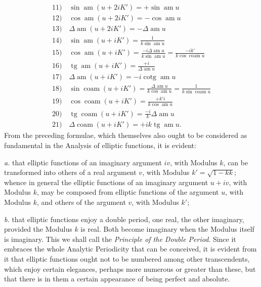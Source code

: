 \documentclass{article}
\begin{document}
\[
\begin{gathered}
\text{11)}\quad\sin\operatorname{am}(u+2iK')=+\sin\operatorname{am}u\\[1ex]
\text{12)}\quad\cos\operatorname{am}(u+2iK')=-\cos\operatorname{am}u\\[1ex]
\text{13)}\quad\Delta\operatorname{am}(u+2iK')=-\Delta\operatorname{am}u\\[1ex]
\text{14)}\quad\sin\operatorname{am}(u+iK')=\frac{1}{k\sin\operatorname{am}u}\\[1ex]
\text{15)}\quad\cos\operatorname{am}(u+iK')=\frac{-i\Delta\operatorname{am}u}{k\sin\operatorname{am}u}=\frac{-ik'}{k\cos\operatorname{coam}u}\\[1ex]
\text{16)}\quad\operatorname{tg}\operatorname{am}(u+iK')=\frac{+i}{\Delta\operatorname{am}u}\\[1ex]
\text{17)}\quad\Delta\operatorname{am}(u+iK')=-i\operatorname{cotg}\operatorname{am}u\\[1ex]
\text{18)}\quad\sin\operatorname{coam}(u+iK')=\frac{\Delta\operatorname{am}u}{k\cos\operatorname{am}u}=\frac{1}{k\sin\operatorname{coam}u}\\[1ex]
\text{19)}\quad\cos\operatorname{coam}(u+iK')=\frac{+k'i}{k\cos\operatorname{am}u}\\[1ex]
\text{20)}\quad\operatorname{tg}\operatorname{coam}(u+iK')=\frac{-i}{k}\Delta\operatorname{am}u\\[1ex]
\text{21)}\quad\Delta\operatorname{coam}(u+iK')=+ik\operatorname{tg}\operatorname{am}u.
\end{gathered}
\]
From the preceding formulae, which themselves also ought to be considered as fundamental in the Analysis of elliptic functions, it is evident:

\emph{a.} that elliptic functions of an imaginary argument $iv$, with Modulus $k$, can be transformed into others of a real argument $v$, with Modulus $k'=\sqrt{1-kk}$; whence in general the elliptic functions of an imaginary argument $u+iv$, with Modulus $k$, may be composed from elliptic functions of the argument $u$, with Modulus $k$, and others of the argument $v$, with Modulus $k'$;

\emph{b.} that elliptic functions enjoy a double period, one real, the other imaginary, provided the Modulus $k$ is real. Both become imaginary when the Modulus itself is imaginary. This we shall call the \emph{Principle of the Double Period}. Since it embraces the whole Analytic Periodicity that can be conceived, it is evident from it that elliptic functions ought not to be numbered among other transcendents, which enjoy certain elegances, perhaps more numerous or greater than these, but that there is in them a certain appearance of being perfect and absolute.
\end{document}
